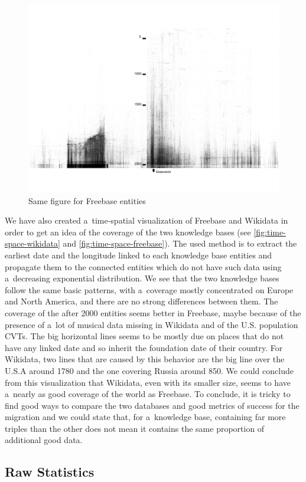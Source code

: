\documentclass{sig-alternate}
\begin{document}
\begin{figure}[!htbp]
\centering
\includegraphics[width=8.45 cm]{img/freebase-time-space.png}
\caption{Same figure for Freebase entities}
\label{fig:time-space-freebase}
\end{figure}

We have also created a~time-spatial visualization of Freebase and Wikidata in order
to get an idea of the coverage of the two knowledge bases
(see \autoref{fig:time-space-wikidata} and \autoref{fig:time-space-freebase}).
The used method is to extract the earliest date and the longitude
linked to each knowledge base entities
and propagate them to the connected entities which do not have such data
using a~decreasing exponential distribution.
We see that the two knowledge bases follow the same basic patterns,
with a~coverage mostly concentrated on Europe and North America,
and there are no strong differences between them.
The coverage of the after 2000 entities seems better in Freebase, maybe because of
the presence of a~lot of musical data missing in Wikidata and of the U.S.
population CVTs.
The big horizontal lines seems to be mostly due on places that do not have any linked date
and so inherit the foundation date of their country.
For Wikidata, two lines that are caused by this behavior are the big line over the U.S.A around 1780
and the one covering Russia around 850.
We could conclude from this visualization that Wikidata, even with its smaller size,
seems to have a~nearly as good coverage of the world as Freebase.
To conclude, it is tricky to find good ways to compare the two databases
and good metrics of success for the migration and we could state that, for a~knowledge base,
containing far more triples than the other does not mean
it contains the same proportion of additional good data.

\subsection{Raw Statistics}
\end{document}
